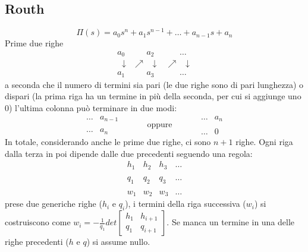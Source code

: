 \begin{landscape}
\begin{multicols*}{3}
    \subsection{Routh}
    \[
        \Pi(s) = a_0s^n + a_1 s^{n-1} + \dots + a_{n-1}s + a_n
    \]
    Prime due righe
    \[
        \begin{matrix}
            a_0 & \;\;\;\;\;\; a_2 & \;\;\;\;\;\;\dots\\
            \;\;\downarrow & \nearrow \;\; \downarrow & \nearrow \;\; \downarrow\\
            a_1 & \;\;\;\;\;\; a_3 & \;\;\;\;\;\;\dots 
        \end{matrix}
    \]
    a seconda che il numero di termini sia pari (le due righe sono di pari lunghezza) o dispari (la prima riga ha un termine in più della seconda, per cui si aggiunge uno $0$) l'ultima colonna può terminare in due modi:
    \[
        \begin{matrix}
            \dots & a_{n-1}\\
            \;\\
            \dots & a_n
        \end{matrix}\;\;\;\;\;\;\;\;\;\;\; \text{oppure}\;\;\;\;\;\;\;\;\;\;\; \begin{matrix}
            \dots &a_n\\
            \;\\
            \dots & 0 
        \end{matrix}
    \]
    In totale, considerando anche le prime due righe, ci sono $n+1$ righe.\newline
    Ogni riga dalla terza in poi dipende dalle due precedenti seguendo una regola:
    \[
        \begin{matrix}
            h_1 & h_2 & h_3 &\dots\\
            \;\\
            q_1 & q_2 & q_3 & \dots\\
            \;\\
            w_1 & w_2 & w_3 & \dots
        \end{matrix}
    \]
    prese due generiche righe ($h_i$ e $q_i$), i termini della riga successiva ($w_i$) si costruiscono come $w_i = - \frac{1}{q_1} det\left[\begin{matrix}
        h_1 & h_{i+1} \\
        q_1 & q_{i+1}
    \end{matrix}\right]$.\newline
    Se manca un termine in una delle righe precedenti ($h$ e $q$) si assume nullo.\newline

\end{multicols*}
\end{landscape}
